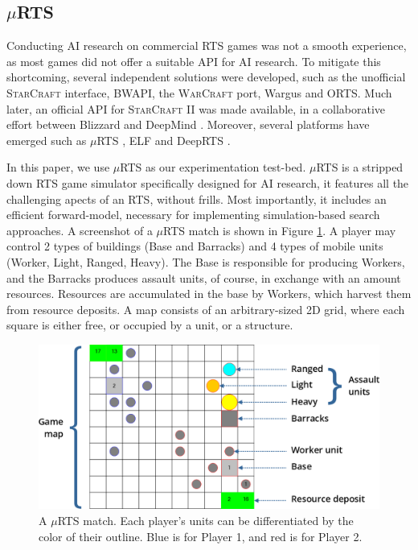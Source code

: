 \documentclass[conference]{IEEEtran}
\newcommand{\mRTS}{$\mu$RTS}
\begin{document}
\subsection{\mRTS{}}

Conducting AI research on commercial RTS games was not a smooth experience, as most games did not offer a suitable API for AI research. To mitigate this shortcoming, several independent solutions were developed, such as the unofficial \textsc{StarCraft} interface, BWAPI, the \textsc{WarCraft} port, Wargus and ORTS. Much later, an official API for \textsc{StarCraft II} was made available, in a collaborative effort between Blizzard and DeepMind \cite{vinyals_starcraft_2017-1}. Moreover, several platforms have emerged such as \mRTS{} \cite{ontanon_combinatorial_2013}, ELF \cite{tian_elf_2017} and DeepRTS \cite{andersen_deep_2018}.

In this paper, we use \mRTS{} as our experimentation test-bed. \mRTS{} is a stripped down RTS game simulator specifically designed for AI research, it features all the challenging apects of an RTS, without frills. Most importantly, it includes an efficient forward-model, necessary for implementing simulation-based search approaches. A screenshot of a \mRTS{} match is shown in Figure \ref{mRTSScreenshot}. A player may control 2 types of buildings (Base and Barracks) and 4 types of mobile units (Worker, Light, Ranged, Heavy). The Base is responsible for producing Workers, and the Barracks produces assault units, of course, in exchange with an amount resources. Resources are accumulated in the base by Workers, which harvest them from resource deposits. A map consists of an arbitrary-sized 2D grid, where each square is either free, or occupied by a unit, or a structure.

\begin{figure}[t]
\begin{center}
	\includegraphics[scale=1]{figs/mRTS.png}
	\caption{A \mRTS{} match. Each player's units can be differentiated by the color of their outline. Blue is for Player 1, and red is for Player 2. }
	\label{mRTSScreenshot}
\end{center}
\end{figure}
\end{document}

